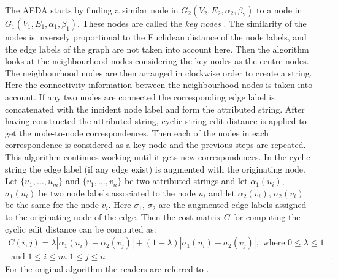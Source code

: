 The AEDA starts by finding a similar node in $G_2(V_2,E_2,\alpha_2,\beta_2)$ to a node in $G_1(V_1,\allowbreak E_1,\allowbreak \alpha_1,\allowbreak \beta_1)$. These nodes are called the \emph{key nodes} \cite{Neuhaus2004}. The similarity of the nodes is inversely proportional to the Euclidean distance of the node labels, and the edge labels of the graph are not taken into account here. Then the algorithm looks at the neighbourhood nodes considering the key nodes as the centre nodes. The neighbourhood nodes are then arranged in clockwise order to create a string. Here the connectivity information between the neighbourhood nodes is taken into account. If any two nodes are connected the corresponding edge label is concatenated with the incident node label and form the attributed string. After having constructed the attributed string, cyclic string edit distance is applied to get the node-to-node correspondences. Then each of the nodes in each correspondence is considered as a key node and the previous steps are repeated. This algorithm continues working until it gets new correspondences. In the cyclic string the edge label (if any edge exist) is augmented with the originating node. Let $\lbrace u_1,\ldots,u_m\rbrace$ and $\lbrace v_1,\ldots,v_n\rbrace$ be two attributed strings and let $\alpha_1(u_i)$, $\sigma_1(u_i)$ be two node labels associated to the node $u_i$ and let $\alpha_2(v_i)$, $\sigma_2(v_i)$ be the same for the node $v_i$. Here $\sigma_1$, $\sigma_2$ are the augmented edge labels assigned to the originating node of the edge. Then the cost matrix $C$ for computing the cyclic edit distance can be computed as:
\begin{align*}
C(i,j)=\lambda\left|\alpha_1(u_i)-\alpha_2(v_j)\right|+(1-\lambda)\left|\sigma_1(u_i)-\sigma_2(v_j)\right|,\mbox{ where }0\le\lambda\le 1&\\
\text{ and }1\le i\le m, 1\le j\le n&.
\label{eqn:ncrag:tot_dist}
\end{align*}
For the original algorithm the readers are referred to \cite{Neuhaus2004}.

